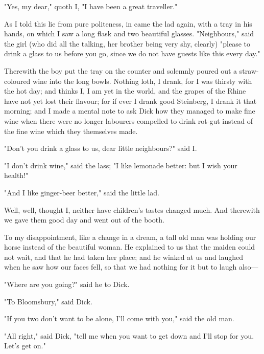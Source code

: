 "Yes, my dear," quoth I, "I have been a great traveller."

As I told this lie from pure politeness, in came the lad again, with a
tray in his hands, on which I saw a long flask and two beautiful
glasses. "Neighbours," said the girl (who did all the talking, her
brother being very shy, clearly) "please to drink a glass to us before
you go, since we do not have guests like this every day."

Therewith the boy put the tray on the counter and solemnly poured out a
straw-coloured wine into the long bowls. Nothing loth, I drank, for I
was thirsty with the hot day; and thinks I, I am yet in the world, and
the grapes of the Rhine have not yet lost their flavour; for if ever I
drank good Steinberg, I drank it that morning; and I made a mental note
to ask Dick how they managed to make fine wine when there were no longer
labourers compelled to drink rot-gut instead of the fine wine which they
themselves made.

"Don't you drink a glass to us, dear little neighbours?" said I.

"I don't drink wine," said the lass; "I like lemonade better: but I wish
your health!"

"And I like ginger-beer better," said the little lad.

Well, well, thought I, neither have children's tastes changed much. And
therewith we gave them good day and went out of the booth.

To my disappointment, like a change in a dream, a tall old man was
holding our horse instead of the beautiful woman. He explained to us
that the maiden could not wait, and that he had taken her place; and he
winked at us and laughed when he saw how our faces fell, so that we had
nothing for it but to laugh also---

"Where are you going?" said he to Dick.

"To Bloomsbury," said Dick.

"If you two don't want to be alone, I'll come with you," said the old
man.

"All right," said Dick, "tell me when you want to get down and I'll stop
for you. Let's get on."

